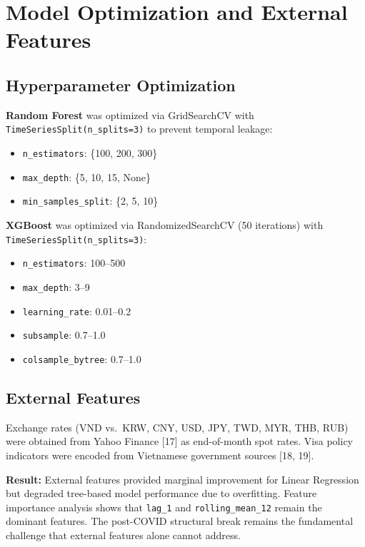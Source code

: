\documentclass[
]{article}
\providecommand{\tightlist}{%
  \setlength{\itemsep}{0pt}\setlength{\parskip}{0pt}}
\begin{document}
\newpage

\section{Model Optimization and External
Features}\label{model-optimization-and-external-features}

\subsection{Hyperparameter
Optimization}\label{hyperparameter-optimization}

\textbf{Random Forest} was optimized via GridSearchCV with
\texttt{TimeSeriesSplit(n\_splits=3)} to prevent temporal leakage:

\begin{itemize}
\tightlist
\item
  \texttt{n\_estimators}: \{100, 200, 300\}
\item
  \texttt{max\_depth}: \{5, 10, 15, None\}
\item
  \texttt{min\_samples\_split}: \{2, 5, 10\}
\end{itemize}

\textbf{XGBoost} was optimized via RandomizedSearchCV (50 iterations)
with \texttt{TimeSeriesSplit(n\_splits=3)}:

\begin{itemize}
\tightlist
\item
  \texttt{n\_estimators}: 100--500
\item
  \texttt{max\_depth}: 3--9
\item
  \texttt{learning\_rate}: 0.01--0.2
\item
  \texttt{subsample}: 0.7--1.0
\item
  \texttt{colsample\_bytree}: 0.7--1.0
\end{itemize}

\subsection{External Features}\label{external-features}

Exchange rates (VND vs.~KRW, CNY, USD, JPY, TWD, MYR, THB, RUB) were
obtained from Yahoo Finance {[}17{]} as end-of-month spot rates. Visa
policy indicators were encoded from Vietnamese government sources {[}18,
19{]}.

\textbf{Result:} External features provided marginal improvement for
Linear Regression but degraded tree-based model performance due to
overfitting. Feature importance analysis shows that \texttt{lag\_1} and
\texttt{rolling\_mean\_12} remain the dominant features. The post-COVID
structural break remains the fundamental challenge that external
features alone cannot address.
\end{document}
